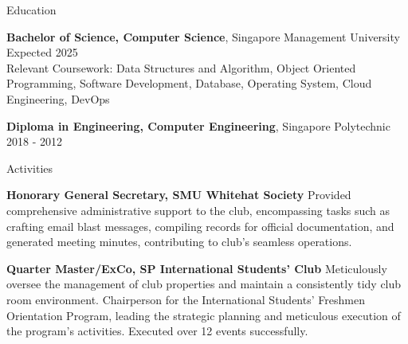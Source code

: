 \documentclass{resume} %
\begin{document}

\begin{rSection}{Education}

{\bf Bachelor of Science, Computer Science}, Singapore Management University \hfill {Expected 2025}\\
Relevant Coursework: Data Structures and Algorithm, Object Oriented Programming, Software Development, Database, Operating System, Cloud Engineering, DevOps

{\bf Diploma in Engineering, Computer Engineering}, Singapore Polytechnic \hfill {2018 - 2012}

\end{rSection}

\begin{rSection}{Activities} 
\vspace{-1.25em}

\item \textbf{Honorary General Secretary, SMU Whitehat Society} {Provided comprehensive administrative support to the club, encompassing tasks such as crafting email blast messages, compiling records for official documentation, and generated meeting minutes, contributing to club’s seamless operations.}

\item \textbf{Quarter Master/ExCo, SP International Students' Club} {Meticulously oversee the management of club properties and maintain a consistently tidy club room environment. Chairperson for the International Students' Freshmen Orientation Program, leading the strategic planning and meticulous execution of the program's activities. Executed over 12 events successfully.}

\end{rSection}
\end{document}
